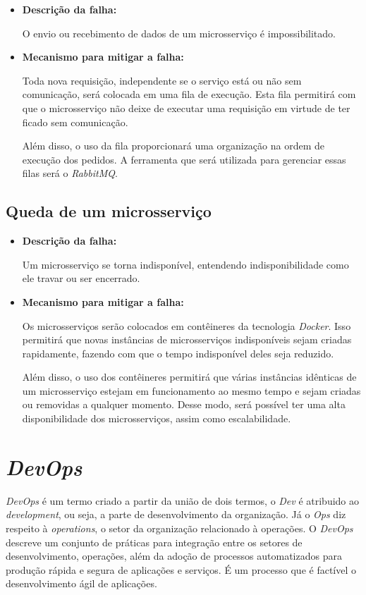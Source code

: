 \begin{itemize}
    \item \textbf{Descrição da falha:}

     O envio ou recebimento de dados de um microsserviço é impossibilitado.

    \item \textbf{Mecanismo para mitigar a falha:}

    Toda nova requisição, independente se o serviço está ou não sem comunicação, será colocada em uma fila de execução. Esta fila permitirá com que o microsserviço não deixe de executar uma requisição em virtude de ter ficado sem comunicação.

    Além disso, o uso da fila proporcionará uma organização na ordem de execução dos pedidos. A ferramenta que será utilizada para gerenciar essas filas será o \textit{RabbitMQ}.
\end{itemize}

\subsection{Queda de um microsserviço}

\begin{itemize}
    \item \textbf{Descrição da falha:}

    Um microsserviço se torna indisponível, entendendo indisponibilidade como ele travar ou ser encerrado.

    \item \textbf{Mecanismo para mitigar a falha:}

    Os microsserviços serão colocados em contêineres da tecnologia \textit{Docker}. Isso permitirá que novas instâncias de microsserviços indisponíveis sejam criadas rapidamente, fazendo com que o tempo indisponível deles seja reduzido.

    Além disso, o uso dos contêineres permitirá que várias instâncias idênticas de um microsserviço estejam em funcionamento ao mesmo tempo e sejam criadas ou removidas a qualquer momento. Desse modo, será possível ter uma alta disponibilidade dos microsserviços, assim como escalabilidade.
\end{itemize}

\section{\textit{DevOps}}

\textit{DevOps} é um termo criado a partir da união de dois termos, o \textit{Dev} é atribuido ao \textit{development}, ou seja, a parte de desenvolvimento da organização. Já o \textit{Ops} diz respeito à \textit{operations}, o setor da organização relacionado à operações. O \textit{DevOps} descreve um conjunto de práticas para integração entre os setores de desenvolvimento, operações, além da adoção de processos automatizados para produção rápida e segura de aplicações e serviços. É um processo que é factível o desenvolvimento ágil de aplicações.

